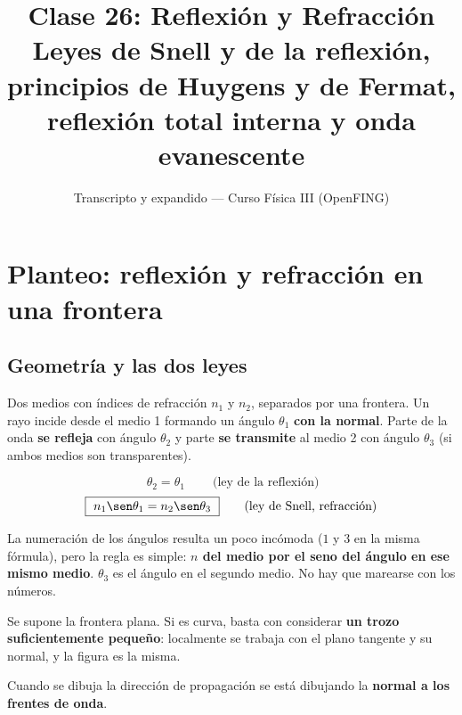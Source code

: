 \documentclass[12pt,a4paper]{article}
\title{\textbf{Clase 26: Reflexión y Refracción}\\[0.3em]
        \large{Leyes de Snell y de la reflexión, principios de Huygens y de
              Fermat, reflexión total interna y onda evanescente}}
\author{Transcripto y expandido --- Curso Física III (OpenFING)}
\date{}
\begin{document}
\maketitle
\thispagestyle{empty}
\newpage

\tableofcontents
\newpage

\section{Planteo: reflexión y refracción en una frontera}

\subsection{Geometría y las dos leyes}

Dos medios con índices de refracción $n_1$ y $n_2$, separados por una frontera.
Un rayo incide desde el medio 1 formando un ángulo $\theta_1$ \textbf{con la
normal}. Parte de la onda \textbf{se refleja} con ángulo $\theta_2$ y parte
\textbf{se transmite} al medio 2 con ángulo $\theta_3$ (si ambos medios son
transparentes).

\begin{keybox}
\[
\boxed{\ \theta_2 = \theta_1\ } \qquad \text{(ley de la reflexión)}
\]
\[
\boxed{\ n_1 \sen\theta_1 = n_2 \sen\theta_3\ }
\qquad \text{(ley de Snell, refracción)}
\]
\end{keybox}

\begin{notebox}
La numeración de los ángulos resulta un poco incómoda ($1$ y $3$ en la misma
fórmula), pero la regla es simple: \textbf{$n$ del medio por el seno del ángulo
en ese mismo medio}. $\theta_3$ es el ángulo en el segundo medio. No hay que
marearse con los números.
\end{notebox}

\begin{notebox}
Se supone la frontera plana. Si es curva, basta con considerar \textbf{un trozo
suficientemente pequeño}: localmente se trabaja con el plano tangente y su
normal, y la figura es la misma.
\end{notebox}

Cuando se dibuja la dirección de propagación se está dibujando la \textbf{normal
a los frentes de onda}.


\end{document}

